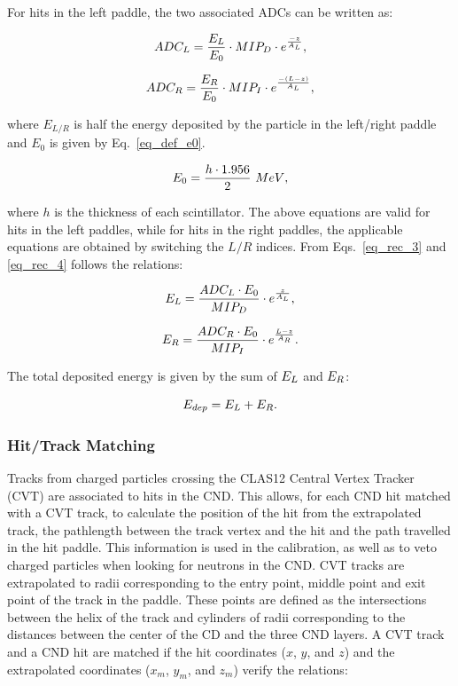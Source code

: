 \documentclass{elsart}
\begin{document}
For hits in the left paddle, the two associated ADCs can be written as:

\begin{equation}
\label{eq_rec_3}
ADC_{\rm{L}}=\frac{E_{\rm{L}}}{E_0}\cdot MIP_{\rm{D}}\cdot e^{\frac{-z}{A_{\rm{L}}}},
\end{equation}

\begin{equation}
\label{eq_rec_4}
ADC_{\rm{R}}=\frac{E_{\rm{R}}}{E_0}\cdot MIP_{\rm{I}}\cdot e^{\frac{-(L-z)}{A_{\rm{L}}}},
\end{equation}

\noindent
where $E_{L/R}$ is half the energy deposited by the particle in the left/right paddle and $E_0$ is given by
Eq.~\ref{eq_def_e0}.

\begin{equation}\label{eq_def_e0}
E_0=\frac{h\cdot 1.956}{2}~\rm{MeV},
\end{equation}

\noindent
where $h$ is the thickness of each scintillator. The above equations are valid for hits in the left paddles, while
for hits in the right paddles, the applicable equations are obtained by switching the $L/R$ indices. From
Eqs.~\ref{eq_rec_3} and \ref{eq_rec_4} follows the relations:

\begin{equation}
E_{\rm{L}}=\frac{ADC_{\rm{L}} \cdot E_0}{MIP_{\rm{D}}}\cdot e^{\frac{z}{A_{\rm{L}}}},
\end{equation}

\begin{equation}
E_{\rm{R}}=\frac{ADC_{\rm{R}} \cdot E_0}{MIP_{\rm{I}}}\cdot e^{\frac{L-z}{A_{\rm{R}}}}.
\end{equation}

\noindent
The total deposited energy is given by the sum of $E_{\rm{L}}$ and $E_{\rm{R}}$:

\begin{equation}
E_{\rm{dep}}=E_{\rm{L}}+E_{\rm{R}}.
\end{equation}

\subsubsection{Hit/Track Matching}

Tracks from charged particles crossing the CLAS12 Central Vertex Tracker (CVT) are associated to hits in
the CND. This allows, for each CND hit matched with a CVT track, to calculate the position of the hit from the
extrapolated track, the pathlength between the track vertex and the hit and the path travelled in the hit
paddle. This information is used in the calibration, as well as to veto charged particles when looking for neutrons
in the CND. CVT tracks are extrapolated to radii corresponding to the entry point, middle point and exit point of
the track in the paddle. These points are defined as the intersections between the helix of the track and cylinders
of radii corresponding to the distances between the center of the CD and the three CND layers. A CVT track and
a CND hit are matched if the hit coordinates ($x$, $y$, and $z$) and the extrapolated coordinates ($x_{m}$,
$y_{m}$, and $z_{m}$) verify the relations:
\end{document}
